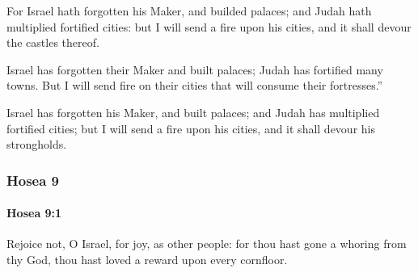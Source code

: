 			\begin{versebox}
					\item[BHS] 
					\item[LXX] 
					\item[ASV] For Israel hath forgotten his Maker, and builded palaces; and Judah hath multiplied fortified cities: but I will send a fire upon his cities, and it shall devour the castles thereof.
					\item[NIV] Israel has forgotten their Maker and built palaces; Judah has fortified many towns. But I will send fire on their cities that will consume their fortresses.”
					\item[NRSV] Israel has forgotten his Maker, and built palaces; and Judah has multiplied fortified cities; but I will send a fire upon his cities, and it shall devour his strongholds.
			\end{versebox}
	\subsubsection{Hosea 9} %
		\label{HOSEA-9}

		\paragraph{Hosea 9:1} %
			\label{HOSEA-9-1}

			Rejoice not, O Israel, for joy, as other people: for thou hast gone a whoring from thy God, thou hast loved a reward upon every cornfloor.

